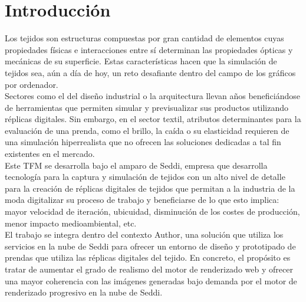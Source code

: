 \chapter{Introducci\'on}

Los tejidos son estructuras compuestas por gran cantidad de elementos cuyas propiedades f\'isicas e interacciones entre s\'i
determinan las propiedades \'opticas y mec\'anicas de su superficie. Estas caracter\'isticas hacen que la simulaci\'on de tejidos
sea, a\'un a d\'ia de hoy, un reto desafiante dentro del campo de los gr\'aficos por ordenador.\\

Sectores como el del dise\~no industrial o la arquitectura llevan a\~nos benefici\'andose de herramientas que permiten
simular y previsualizar sus productos utilizando r\'eplicas digitales. Sin embargo, en el sector textil, atributos determinantes
para la evaluaci\'on de una prenda, como el brillo, la ca\'ida o su elasticidad requieren de una simulaci\'on hiperrealista
que no ofrecen las soluciones dedicadas a tal fin existentes en el mercado.\\

Este TFM se desarrolla bajo el amparo de Seddi, empresa que desarrolla tecnolog\'ia para la captura y simulaci\'on de tejidos
con un alto nivel de detalle para la creaci\'on de r\'eplicas digitales de tejidos que permitan a la industria de la moda
digitalizar su proceso de trabajo y beneficiarse de lo que esto implica: mayor velocidad de iteraci\'on, ubicuidad, disminuci\'on de
los costes de producci\'on, menor impacto medioambiental, etc.\\

El trabajo se integra dentro del contexto Author, una soluci\'on que utiliza los servicios en la nube de Seddi para ofrecer
un entorno de dise\~no y prototipado de prendas que utiliza las r\'eplicas digitales del tejido. En concreto, el prop\'osito
es tratar de aumentar el grado de realismo del motor de renderizado web y ofrecer una mayor coherencia
con las im\'agenes generadas bajo demanda por el motor de renderizado progresivo en la nube de Seddi.








